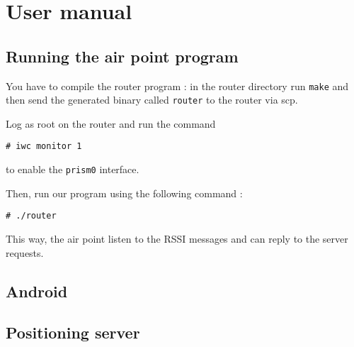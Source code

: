 \section{User manual}

\subsection{Running the air point program}

You have to compile the router program : in the router directory run \verb+make+
and then send the generated binary called \verb+router+ to the router via scp.

Log as root on the router and run the command 

\verb+# iwc monitor 1+

to enable the \verb+prism0+ interface.

Then, run our program using the following command :

\verb+# ./router+

This way, the air point listen to the RSSI messages and can reply to the server
requests.

\subsection{Android}

\subsection{Positioning server}

